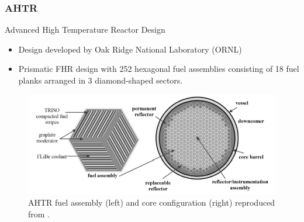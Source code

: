 \begin{frame}
  \frametitle{AHTR}
  \begin{block}{Advanced High Temperature Reactor Design}
    \begin{itemize}
      \item Design developed by Oak Ridge National Laboratory (ORNL)
      \item Prismatic FHR design with 252 hexagonal fuel assemblies consisting of 
      18 fuel planks arranged in 3 diamond-shaped sectors. 
    \end{itemize}
  \end{block}
  \begin{figure}[]
    \centering
    \includegraphics[width=0.8\linewidth]{../docs/figures/ahtr.png} 
    \caption{\acrlong{AHTR} fuel assembly (left) and core configuration (right) 
    reproduced from \cite{ramey_monte_2018}.}
    \label{fig:ahtr}
\end{figure}
\end{frame}


